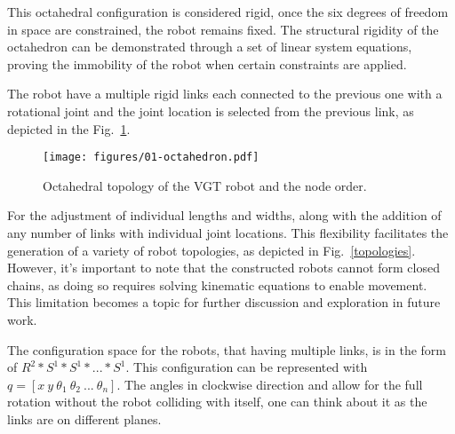 \documentclass{IEEEtaes}
\newcommand{\algrule}[1][.1pt]{\par\vskip.2\baselineskip\hrule height #1\par\vskip.5\baselineskip}
\begin{document}
This octahedral configuration is considered rigid, once the six degrees of freedom in space are constrained, the robot remains fixed. The structural rigidity of the octahedron can be demonstrated through a set of linear system equations, proving the immobility of the robot when certain constraints are applied.

%

The robot have a multiple rigid links each connected to the previous one with a rotational joint and the joint location is selected from the previous link, as depicted in the Fig.~\ref{robot}.
\begin{figure}[t!]
    \begin{center}
        \texttt{[image: figures/01-octahedron.pdf]}
     \end{center}
     \caption{Octahedral topology of the VGT robot and the node order.}
     \label{robot}
\end{figure}

For the adjustment of individual lengths and widths, along with the addition of any number of links with individual joint locations. This flexibility facilitates the generation of a variety of robot topologies, as depicted in Fig.~\ref{topologies}. However, it's important to note that the constructed robots cannot form closed chains, as doing so requires solving kinematic equations to enable movement. This limitation becomes a topic for further discussion and exploration in future work.

The configuration space for the robots, that having multiple links, is in the form of $R^2*S^1*S^1*...*S^1$. This configuration can be represented with $q = [ x \ y \ \theta_1 \ \theta_2 \ ... \ \theta_n ]$. The angles in clockwise direction and allow for the full rotation without the robot colliding with itself, one can think about it as the links are on different planes.

\end{document}
